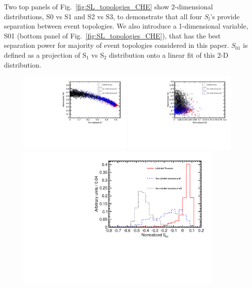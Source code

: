 \documentclass[12pt,twoside,letterpaper]{article}
\begin{document}
Two top panels of Fig.~\ref{fig:SL_topologies_CHE} show 2-dimensional distributions, S0 vs S1 and S2 vs S3, to demonstrate that all four $S_l$'s provide separation between event topologies.  We also introduce a 1-dimensional variable, S01 (bottom panel of Fig.~\ref{fig:SL_topologies_CHE}), that has the best separation power for majority of event topologies considered in this paper. $S_{01}$ is defined as a projection of S$_1$ vs S$_2$ distribution onto a linear fit of this 2-D distribution.

\begin{figure}[htb]
\centering
\includegraphics[angle=0,width=0.49\textwidth]{plots/ALL/hS0vsS1_topologies_CHELight_VtxSmear0cm_VtxShiftX0cm_33p5ns_center.pdf}
\includegraphics[angle=0,width=0.49\textwidth]{plots/ALL/hS2vsS3_topologies_CHELight_VtxSmear0cm_VtxShiftX0cm_33p5ns_center.pdf}
\includegraphics[angle=0,width=0.9\textwidth]{plots/ALL/hS01_topologies_CHELight_VtxSmear0cm_VtxShiftX0cm_33p5ns_center.pdf}

\end{figure}
\end{document}
